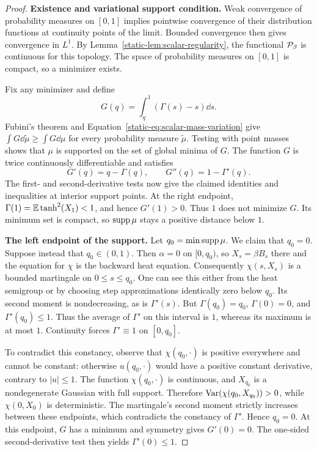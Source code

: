 \begin{proof}
\par\medskip\noindent\textbf{Existence and variational support condition.}\enspace
Weak convergence of probability measures on $[0,1]$ implies
pointwise convergence of their distribution functions at continuity
points of the limit. Bounded convergence then gives convergence in
$L^1$. By Lemma~\ref{static-lem:scalar-regularity}, the functional
$\mathcal P_\beta$ is continuous for this topology. The space of probability
measures on $[0,1]$ is compact, so a minimizer exists.

Fix any minimizer and define
\[
 G(q)=\int_q^1(\Gamma(s)-s)\dd s.
\]
Fubini's theorem and Equation~\eqref{static-eq:scalar-mass-variation}
give $\int G\dd\widetilde\mu\ge\int G\dd\mu$ for every
probability measure $\widetilde\mu$. Testing with point masses shows
that $\mu$ is supported on the set of global minima of $G$.
The function $G$ is twice continuously differentiable and satisfies
\[
 G'(q)=q-\Gamma(q),\qquad G''(q)=1-\Gamma'(q).
\]
The first- and second-derivative tests now give the claimed identities
and inequalities at interior support points. At the right endpoint,
$\Gamma(1)=\mathbb E\tanh^2(X_1)<1$, and hence $G'(1)>0$.
Thus $1$ does not minimize $G$. Its minimum set is compact, so
$\operatorname{supp}\mu$ stays a positive distance below $1$.

\par\medskip\noindent\textbf{The left endpoint of the support.}\enspace
Let $q_0=\min\operatorname{supp}\mu$. We claim that $q_0=0$. Suppose instead
that $q_0\in(0,1)$. Then $\alpha=0$ on $[0,q_0)$, so
$X_s=\beta B_s$ there and the equation for $\chi$ is the backward
heat equation. Consequently $\chi(s,X_s)$ is a bounded martingale
on $0\le s\le q_0$. One can see this either from the heat
semigroup or by choosing step approximations identically zero below
$q_0$. Its second moment is nondecreasing, as is $\Gamma'(s)$.
But $\Gamma(q_0)=q_0$, $\Gamma(0)=0$, and
$\Gamma'(q_0)\le1$. Thus the average of $\Gamma'$ on this
interval is $1$, whereas its maximum is at most $1$. Continuity
forces $\Gamma'\equiv1$ on $[0,q_0]$.

To contradict this constancy, observe that $\chi(q_0,\cdot)$ is
positive everywhere and cannot be constant: otherwise
$u(q_0,\cdot)$ would have a positive constant derivative, contrary
to $|u|\le1$. The function $\chi(q_0,\cdot)$ is continuous, and
$X_{q_0}$ is a nondegenerate Gaussian with full support. Therefore
$\operatorname{Var}(\chi(q_0,X_{q_0}))>0$, while $\chi(0,X_0)$ is
deterministic. The martingale's second moment strictly increases
between these endpoints, which contradicts the constancy of
$\Gamma'$. Hence $q_0=0$. At this endpoint, $G$ has a minimum
and symmetry gives $G'(0)=0$. The one-sided second-derivative test
then yields $\Gamma'(0)\le1$.


\end{proof}
